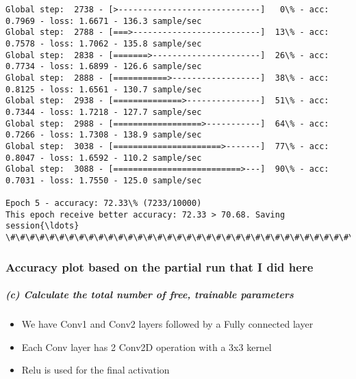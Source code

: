 \documentclass[11pt]{article}
\providecommand{\tightlist}{%
      \setlength{\itemsep}{0pt}\setlength{\parskip}{0pt}}
\begin{document}
\begin{Verbatim}[commandchars=\\\{\}]
Global step:  2738 - [>-----------------------------]   0\% - acc: 0.7969 - loss: 1.6671 - 136.3 sample/sec
Global step:  2788 - [===>--------------------------]  13\% - acc: 0.7578 - loss: 1.7062 - 135.8 sample/sec
Global step:  2838 - [=======>----------------------]  26\% - acc: 0.7734 - loss: 1.6899 - 126.6 sample/sec
Global step:  2888 - [===========>------------------]  38\% - acc: 0.8125 - loss: 1.6561 - 130.7 sample/sec
Global step:  2938 - [==============>---------------]  51\% - acc: 0.7344 - loss: 1.7218 - 127.7 sample/sec
Global step:  2988 - [==================>-----------]  64\% - acc: 0.7266 - loss: 1.7308 - 138.9 sample/sec
Global step:  3038 - [======================>-------]  77\% - acc: 0.8047 - loss: 1.6592 - 110.2 sample/sec
Global step:  3088 - [==========================>---]  90\% - acc: 0.7031 - loss: 1.7550 - 125.0 sample/sec

Epoch 5 - accuracy: 72.33\% (7233/10000)
This epoch receive better accuracy: 72.33 > 70.68. Saving session{\ldots}
\#\#\#\#\#\#\#\#\#\#\#\#\#\#\#\#\#\#\#\#\#\#\#\#\#\#\#\#\#\#\#\#\#\#\#\#\#\#\#\#\#\#\#\#\#\#\#\#\#\#\#\#\#\#\#\#\#\#\#\#\#\#\#\#\#\#\#\#\#\#\#\#\#\#\#\#\#\#\#\#\#\#\#\#\#\#\#\#\#\#\#\#\#\#\#\#\#\#\#\#\#\#\#\#\#\#\#

    \end{Verbatim}

    \subsubsection{Accuracy plot based on the partial run that I did
here}\label{accuracy-plot-based-on-the-partial-run-that-i-did-here}

\subparagraph{(c) Calculate the total number of free, trainable
parameters}\label{c-calculate-the-total-number-of-free-trainable-parameters}

\begin{itemize}
\tightlist
\item
  We have Conv1 and Conv2 layers followed by a Fully connected layer
\item
  Each Conv layer has 2 Conv2D operation with a 3x3 kernel
\item
  Relu is used for the final activation
\end{itemize}
\end{document}
